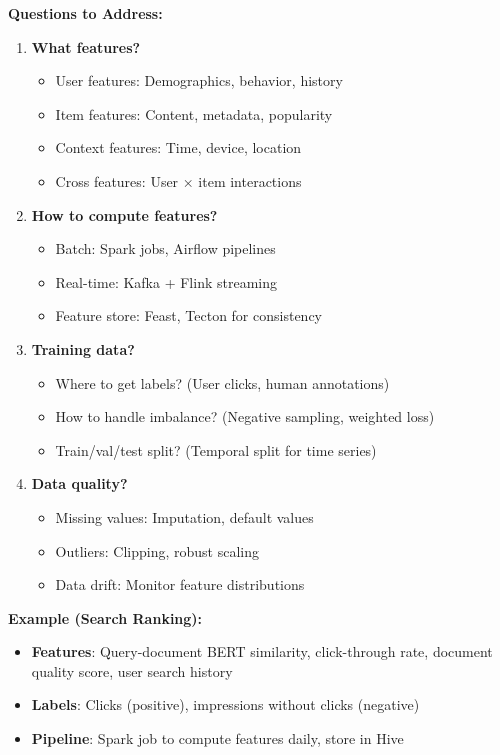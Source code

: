 \documentclass[10pt]{article}
\begin{document}
\textbf{Questions to Address:}
\begin{enumerate}
\item \textbf{What features?}
\begin{itemize}
\item User features: Demographics, behavior, history
\item Item features: Content, metadata, popularity
\item Context features: Time, device, location
\item Cross features: User × item interactions
\end{itemize}

\item \textbf{How to compute features?}
\begin{itemize}
\item Batch: Spark jobs, Airflow pipelines
\item Real-time: Kafka + Flink streaming
\item Feature store: Feast, Tecton for consistency
\end{itemize}

\item \textbf{Training data?}
\begin{itemize}
\item Where to get labels? (User clicks, human annotations)
\item How to handle imbalance? (Negative sampling, weighted loss)
\item Train/val/test split? (Temporal split for time series)
\end{itemize}

\item \textbf{Data quality?}
\begin{itemize}
\item Missing values: Imputation, default values
\item Outliers: Clipping, robust scaling
\item Data drift: Monitor feature distributions
\end{itemize}
\end{enumerate}

\textbf{Example (Search Ranking):}
\begin{itemize}
\item \textbf{Features}: Query-document BERT similarity, click-through rate, document quality score, user search history
\item \textbf{Labels}: Clicks (positive), impressions without clicks (negative)
\item \textbf{Pipeline}: Spark job to compute features daily, store in Hive
\end{itemize}
\end{document}
